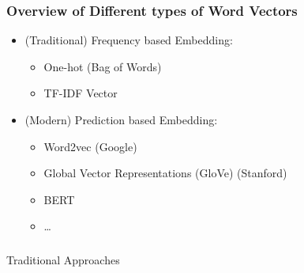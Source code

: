 \begin{frame}[fragile]\frametitle{Overview of Different types of Word Vectors}
\begin{itemize}
\item (Traditional) Frequency based Embedding:
\begin{itemize}
\item One-hot (Bag of Words)
\item TF-IDF Vector
\end{itemize}
\item (Modern) Prediction based Embedding:
\begin{itemize}
\item Word2vec  (Google)
\item Global Vector Representations (GloVe)   (Stanford)
\item BERT
\item \ldots
\end{itemize}
\end{itemize}
\end{frame}




\begin{frame}[fragile]\frametitle{}

\begin{center}
{\Large Traditional Approaches}
\end{center}
\end{frame}


